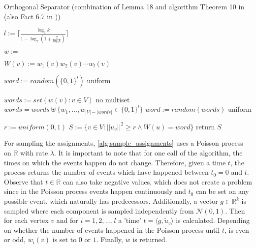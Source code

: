 \begin{algorithm}[htpb]
	\caption{Orthogonal Separator (combination of Lemma 18 and algorithm Theorem 10 in \cite{LouisM14} (also Fact 6.7 in \cite{ChanLTZ16})) \label{alg:orthogonal_separator}} 
\begin{algorithmic}
	\State $l := \lceil \frac{\log_2 k}{1-\log_2 (1+\frac{2}{log_2 k})}\rceil$


	
	\State $w := $
	
	\State $W(v) := w_1(v)w_2(v)\cdots w_l(v)$
	\EndFor
	
	\State $word := random( \{0,1\}^l)$ \Comment uniform
	
	\Else
	 
	\State $words := set({w(v): v\in V})$ \Comment no multiset
	\State $words = words \uplus \{w_1, \ldots , w_{|V|-|words|} \in \{0,1\}^l\} $ 
	\State $word := random(words)$ \Comment uniform
	
	\EndIf
	
	\State $r := uniform(0,1)$
	\State $S := \{v \in V: ||u_v||^2 \ge r \land W(u) = word \}$
	\State return $S$
	
	\EndFunction %
\end{algorithmic}
\end{algorithm}	

For sampling the assignments, \cref{alg:sample_assignments} uses a Poisson process on $\mathbb{R}$ with rate $\lambda$. It is important to note that for one call of the algorithm, the times on which the events happen do not change. Therefore, given a time $t$, the process returns the number of events which have happened between $t_0 = 0$ and $t$. Observe that $t\in \mathbb{R}$ can also take negative values, which does not create a problem since in the Poisson process events happen continuously and $t_0$ can be set on any possible event, which naturally has predecessors.
Additionally, a vector $g \in \mathbb{R}^k$ is sampled where each component is sampled independently from $\mathcal{N}(0,1)$. Then for each vertex $v$ and for $i = 1, 2, \ldots, l$ a 'time' $t = \langle g, \tilde{u}_v \rangle $ is calculated.
Depending on whether the number of events happened in the Poisson process until $t$, is even or odd, $w_i(v)$ is set to $0$ or $1$. Finally, $w$ is returned.

